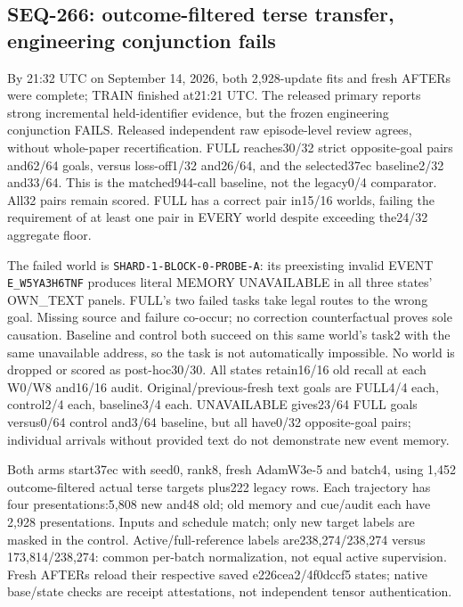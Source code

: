 \documentclass{article}
\begin{document}
\subsection{SEQ-266: outcome-filtered terse transfer, engineering conjunction fails}
\label{sec:quality-breadth-fit}

By 21:32 UTC on September 14, 2026, both 2,928-update fits and fresh AFTERs
were complete; TRAIN finished at21:21 UTC. The released primary reports strong
incremental held-identifier evidence, but the frozen engineering conjunction
FAILS. Released independent raw episode-level review agrees, without whole-paper
recertification. FULL reaches30/32 strict opposite-goal pairs and62/64 goals,
versus loss-off1/32 and26/64, and the selected37ec baseline2/32 and33/64.
This is the matched944-call baseline, not the legacy0/4 comparator. All32 pairs
remain scored. FULL has a correct pair in15/16 worlds, failing the requirement
of at least one pair in EVERY world despite exceeding the24/32 aggregate floor.

The failed world is \texttt{SHARD-1-BLOCK-0-PROBE-A}: its preexisting invalid EVENT
\texttt{E\_W5YA3H6TNF} produces literal MEMORY UNAVAILABLE in all three states' OWN\_TEXT
panels. FULL's two failed tasks take legal routes to the wrong goal. Missing
source and failure co-occur; no correction counterfactual proves sole causation.
Baseline and control both succeed on this same world's task2 with the same
unavailable address, so the task is not automatically impossible. No world is
dropped or scored as post-hoc30/30. All states retain16/16 old
recall at each W0/W8 and16/16 audit. Original/previous-fresh text goals are
FULL4/4 each, control2/4 each, baseline3/4 each. UNAVAILABLE gives23/64 FULL
goals versus0/64 control and3/64 baseline, but all have0/32 opposite-goal pairs;
individual arrivals without provided text do not demonstrate new event memory.

Both arms start37ec with seed0, rank8, fresh AdamW3e-5 and batch4, using
1,452 outcome-filtered actual terse targets plus222 legacy rows. Each trajectory
has four presentations:5,808 new and48 old; old memory and cue/audit each have
2,928 presentations. Inputs and schedule match; only new target labels are
masked in the control. Active/full-reference labels are238,274/238,274 versus
173,814/238,274: common per-batch normalization, not equal active supervision.
Fresh AFTERs reload their respective saved e226cea2/4f0dccf5 states; native
base/state checks are receipt attestations, not independent tensor authentication.
\end{document}
